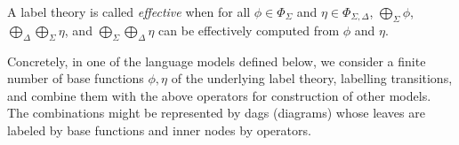 
\noindent
A label theory is called \emph{effective} when 
for all $\phi \in \Phi_\Sigma$ and $\eta \in \Phi_{\Sigma, \Delta}$, 
$\bigoplus_{\Sigma} \phi$, 
$\bigoplus_{\Delta}\bigoplus_{\Sigma} \eta$, and
$\bigoplus_{\Sigma}\bigoplus_{\Delta} \eta$
can be effectively computed from $\phi$ and $\eta$.




Concretely, in one of the language models defined below, 
we consider a finite number of base functions $\phi, \eta$ of the underlying label theory,
labelling transitions, and combine them with the above operators for construction of 
other models.
The combinations might be represented by dags (diagrams) whose leaves are labeled
by base functions and inner nodes by operators.



